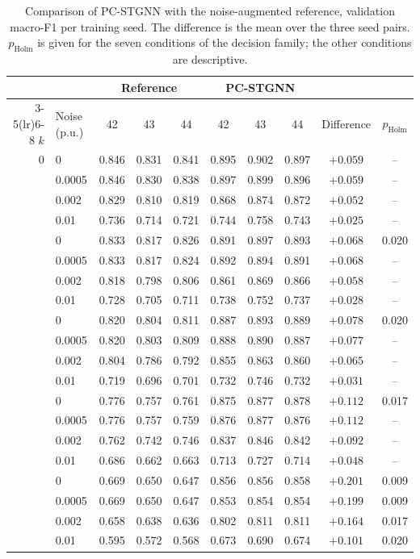 \documentclass[MTech]{ugthesis}
\begin{document}
\begin{table}[htbp]
\caption{Comparison of \acs{PC-STGNN} with the noise-augmented reference, validation macro-F1 per training seed. The difference is the mean over the three seed pairs. $p_{\mathrm{Holm}}$ is given for the seven conditions of the decision family; the other conditions are descriptive.}
\label{tab:gate4}
\footnotesize
\centering
\begin{tabular}{@{}rlcccccccc@{}}
\toprule
 & & \multicolumn{3}{c}{Reference} & \multicolumn{3}{c}{\acs{PC-STGNN}} & & \\
\cmidrule(lr){3-5}\cmidrule(lr){6-8}
$k$ & Noise (p.u.) & 42 & 43 & 44 & 42 & 43 & 44 & Difference & $p_{\mathrm{Holm}}$ \\
\midrule
0 & 0 & 0.846 & 0.831 & 0.841 & 0.895 & 0.902 & 0.897 & $+0.059$ & -- \\
 & 0.0005 & 0.846 & 0.830 & 0.838 & 0.897 & 0.899 & 0.896 & $+0.059$ & -- \\
 & 0.002 & 0.829 & 0.810 & 0.819 & 0.868 & 0.874 & 0.872 & $+0.052$ & -- \\
 & 0.01 & 0.736 & 0.714 & 0.721 & 0.744 & 0.758 & 0.743 & $+0.025$ & -- \\
\addlinespace
1 & 0 & 0.833 & 0.817 & 0.826 & 0.891 & 0.897 & 0.893 & $+0.068$ & 0.020 \\
 & 0.0005 & 0.833 & 0.817 & 0.824 & 0.892 & 0.894 & 0.891 & $+0.068$ & -- \\
 & 0.002 & 0.818 & 0.798 & 0.806 & 0.861 & 0.869 & 0.866 & $+0.058$ & -- \\
 & 0.01 & 0.728 & 0.705 & 0.711 & 0.738 & 0.752 & 0.737 & $+0.028$ & -- \\
\addlinespace
2 & 0 & 0.820 & 0.804 & 0.811 & 0.887 & 0.893 & 0.889 & $+0.078$ & 0.020 \\
 & 0.0005 & 0.820 & 0.803 & 0.809 & 0.888 & 0.890 & 0.887 & $+0.077$ & -- \\
 & 0.002 & 0.804 & 0.786 & 0.792 & 0.855 & 0.863 & 0.860 & $+0.065$ & -- \\
 & 0.01 & 0.719 & 0.696 & 0.701 & 0.732 & 0.746 & 0.732 & $+0.031$ & -- \\
\addlinespace
5 & 0 & 0.776 & 0.757 & 0.761 & 0.875 & 0.877 & 0.878 & $+0.112$ & 0.017 \\
 & 0.0005 & 0.776 & 0.757 & 0.759 & 0.876 & 0.877 & 0.876 & $+0.112$ & -- \\
 & 0.002 & 0.762 & 0.742 & 0.746 & 0.837 & 0.846 & 0.842 & $+0.092$ & -- \\
 & 0.01 & 0.686 & 0.662 & 0.663 & 0.713 & 0.727 & 0.714 & $+0.048$ & -- \\
\addlinespace
10 & 0 & 0.669 & 0.650 & 0.647 & 0.856 & 0.856 & 0.858 & $+0.201$ & 0.009 \\
 & 0.0005 & 0.669 & 0.650 & 0.647 & 0.853 & 0.854 & 0.854 & $+0.199$ & 0.009 \\
 & 0.002 & 0.658 & 0.638 & 0.636 & 0.802 & 0.811 & 0.811 & $+0.164$ & 0.017 \\
 & 0.01 & 0.595 & 0.572 & 0.568 & 0.673 & 0.690 & 0.674 & $+0.101$ & 0.020 \\
\bottomrule
\end{tabular}
\end{table}
\end{document}
